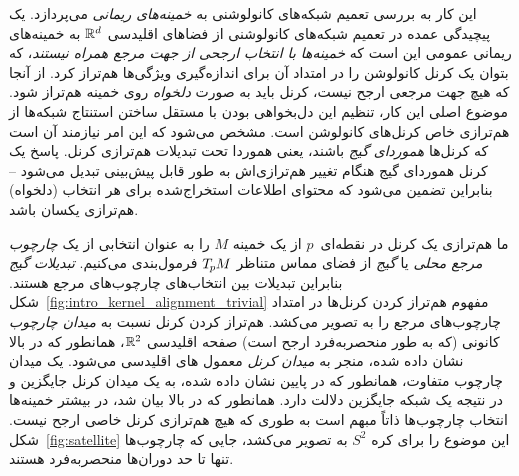 این کار به بررسی تعمیم شبکه‌های کانولوشنی به \emph{خمینه‌های ریمانی} می‌پردازد.
یک پیچیدگی عمده در تعمیم شبکه‌های کانولوشنی از فضاهای اقلیدسی $\mathbb{R}^d$ به خمینه‌های ریمانی عمومی این است که \emph{خمینه‌ها با انتخاب ارجحی از جهت مرجع همراه نیستند}، که بتوان یک کرنل کانولوشن را در امتداد آن برای اندازه‌گیری ویژگی‌ها هم‌تراز کرد.
از آنجا که هیچ جهت مرجعی ارجح نیست، کرنل باید به صورت \emph{دلخواه} روی خمینه هم‌تراز شود.
موضوع اصلی این کار، تنظیم این دل‌بخواهی بودن با مستقل ساختن استنتاج شبکه‌ها از هم‌ترازی خاص کرنل‌های کانولوشن است.
مشخص می‌شود که این امر نیازمند آن است که کرنل‌ها \emph{هموردای گیج} باشند، یعنی هموردا تحت تبدیلات هم‌ترازی کرنل.
پاسخ یک کرنل هموردای گیج هنگام تغییر هم‌ترازی‌اش به طور قابل پیش‌بینی تبدیل می‌شود
-- بنابراین تضمین می‌شود که محتوای اطلاعات استخراج‌شده برای هر انتخاب (دلخواه) هم‌ترازی یکسان باشد.


ما هم‌ترازی یک کرنل در نقطه‌ای~$p$ از یک خمینه $M$ را به عنوان انتخابی از یک \emph{چارچوب مرجع محلی} یا \emph{گیج} از فضای مماس متناظر $T_{\mkern-1.5mu p}\mkern-.5muM$ فرمول‌بندی می‌کنیم.
\emph{تبدیلات گیج} بنابراین تبدیلات بین انتخاب‌های چارچوب‌های مرجع هستند.
شکل~\ref{fig:intro_kernel_alignment_trivial} مفهوم هم‌تراز کردن کرنل‌ها در امتداد چارچوب‌های مرجع را به تصویر می‌کشد.
هم‌تراز کردن کرنل نسبت به \emph{میدان چارچوب} کانونی (که به طور منحصربه‌فرد ارجح است) صفحه اقلیدسی $\mathbb{R}^2$، همانطور که در بالا نشان داده شده، منجر به \emph{میدان کرنل} معمول \CNN{}های اقلیدسی می‌شود.
یک میدان چارچوب متفاوت، همانطور که در پایین نشان داده شده، به یک میدان کرنل جایگزین و در نتیجه یک شبکه جایگزین دلالت دارد.
همانطور که در بالا بیان شد، در بیشتر خمینه‌ها انتخاب چارچوب‌ها ذاتاً مبهم است به طوری که هیچ هم‌ترازی کرنل خاصی ارجح نیست.
شکل~\ref{fig:satellite} این موضوع را برای کره $S^2$ به تصویر می‌کشد، جایی که چارچوب‌ها تنها تا حد دوران‌ها منحصربه‌فرد هستند.


